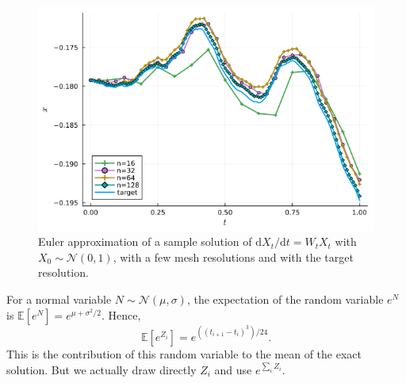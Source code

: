 \documentclass[reqno,12pt]{amsart}
\theoremstyle{plain} %
\theoremstyle{definition} %
\begin{document}
\begin{figure}
    \includegraphics[scale=0.6]{img/approximation_linearhomogenous.png}
    \caption{Euler approximation of a sample solution of $\mathrm{d}X_t/\mathrm{d}t = W_t X_t$ with $X_0 \sim \mathcal{N}(0, 1)$, with a few mesh resolutions and with the target resolution.}
    \label{samplepathslinearhomogeneousrode}
\end{figure}

For a normal variable $N \sim \mathcal{N}(\mu, \sigma)$, the expectation of the random variable $e^N$ is $\mathbb{E}[e^N] = e^{\mu + \sigma^2/2}$. Hence,
\begin{equation}
    \mathbb{E}[e^{Z_i}] = e^{((t_{i+1}- t_i)^3)/24}.
\end{equation}
This is the contribution of this random variable to the mean of the exact solution. But we actually draw directly $Z_i$ and use $e^{\sum_i Z_i}$.
\end{document}
